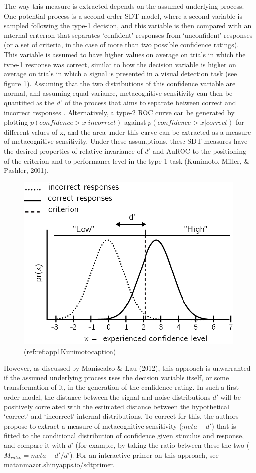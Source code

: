 \documentclass[12pt,twoside]{reedthesis}
\begin{document}
The way this measure is extracted depends on the assumed underlying process. One potential process is a second-order SDT model, where a second variable is sampled following the type-1 decision, and this variable is then compared with an internal criterion that separates `confident' responses from `unconfident' responses (or a set of criteria, in the case of more than two possible confidence ratings). This variable is assumed to have higher values on average on trials in which the type-1 response was correct, similar to how the decision variable is higher on average on trials in which a signal is presented in a visual detection task (see figure \ref{fig:app1-kunimoto}). Assuming that the two distributions of this confidence variable are normal, and assuming equal-variance, metacognitive sensitivity can then be quantified as the \(d'\) of the process that aims to separate between correct and incorrect responses . Alternatively, a type-2 ROC curve can be generated by plotting \(p(confidence>x|incorrect)\) against \(p(confidence>x|correct)\) for different values of x, and the area under this curve can be extracted as a measure of metacognitive sensitivity. Under these assumptions, these SDT measures have the desired properties of relative invariance of \(d'\) and AuROC to the positioning of the criterion and to performance level in the type-1 task (Kunimoto, Miller, \& Pashler, 2001).


\begin{figure}
\includegraphics[width=0.6\linewidth]{figure/app-SDT/kunimoto_rep} \caption[A second order SDT model]{(ref:ref:app1Kunimotocaption)}\label{fig:app1-kunimoto}
\end{figure}
However, as discussed by Maniscalco \& Lau (2012), this approach is unwarranted if the assumed underlying process uses the decision variable itself, or some transformation of it, in the generation of the confidence rating. In such a first-order model, the distance between the signal and noise distributions \(d'\) will be positively correlated with the estimated distance between the hypothetical `correct' and `incorrect' internal distributions. To correct for this, the authors propose to extract a measure of metacognitive sensitivity (\(meta-d'\)) that is fitted to the conditional distribution of confidence given stimulus and response, and compare it with \(d'\) (for example, by taking the ratio between these the two (\(M_{ratio}=meta-d'/d'\)). For an interactive primer on this approach, see \url{matanmazor.shinyapps.io/sdtprimer}.
\end{document}

